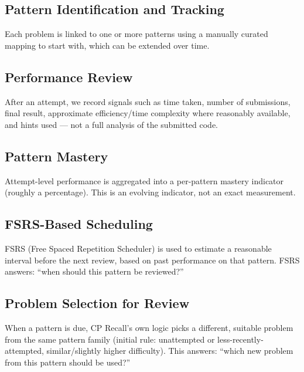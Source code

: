 \documentclass[11pt,a4paper]{article}
\begin{document}
\subsection{Pattern Identification and Tracking}
Each problem is linked to one or more patterns using a manually curated mapping to start with, which can be extended over time.

\subsection{Performance Review}
After an attempt, we record signals such as time taken, number of submissions, final result, approximate efficiency/time complexity where reasonably available, and hints used --- not a full analysis of the submitted code.

\subsection{Pattern Mastery}
Attempt-level performance is aggregated into a per-pattern mastery indicator (roughly a percentage). This is an evolving indicator, not an exact measurement.

\subsection{FSRS-Based Scheduling}
FSRS (Free Spaced Repetition Scheduler) is used to estimate a reasonable interval before the next review, based on past performance on that pattern. FSRS answers: ``when should this pattern be reviewed?''

\subsection{Problem Selection for Review}
When a pattern is due, CP Recall's own logic picks a different, suitable problem from the same pattern family (initial rule: unattempted or less-recently-attempted, similar/slightly higher difficulty). This answers: ``which new problem from this pattern should be used?''
\end{document}
